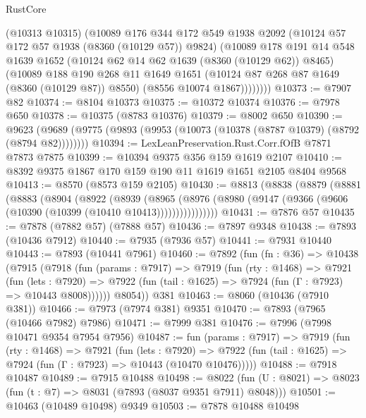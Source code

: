 \begin{lexlean}{RustCore}
\begin{coremodule}
            (@10313 @10315)
            (@10089
              @176
              @344
              @172
              @549
              @1938
              @2092
              (@10124 @57 @172 @57 @1938 (@8360 (@10129 @57)) @9824)
              (@10089
                @178
                @191
                @14
                @548
                @1639
                @1652
                (@10124 @62 @14 @62 @1639 (@8360 (@10129 @62)) @8465)
                (@10089
                  @188
                  @190
                  @268
                  @11
                  @1649
                  @1651
                  (@10124 @87 @268 @87 @1649 (@8360 (@10129 @87)) @8550)
                  (@8556 @10074 @1867))))))))
@10373 := @7907 @82
@10374 := @8104 @10373
@10375 := @10372 @10374
@10376 := @7978 @650
@10378 := @10375 (@8783 @10376)
@10379 := @8002 @650
@10390 := @9623 (@9689 (@9775 (@9893 (@9953 (@10073 (@10378 (@8787 @10379) (@8792 (@8794 @82))))))))
@10394 := LexLeanPreservation.Rust.Corr.fOfB @7871 @7873 @7875
@10399 := @10394 @9375 @356 @159 @1619 @2107
@10410 := @8392 @9375 @1867 @170 @159 @190 @11 @1619 @1651 @2105 @8404 @9568
@10413 := @8570 (@8573 @159 @2105)
@10430 := @8813
    (@8838
      (@8879
        (@8881
          (@8883
            (@8904
              (@8922
                (@8939
                  (@8965
                    (@8976
                      (@8980 (@9147 (@9366 (@9606 (@10390 (@10399 (@10410 @10413))))))))))))))))
@10431 := @7876 @57
@10435 := @7878 (@7882 @57) (@7888 @57)
@10436 := @7897 @9348
@10438 := @7893 (@10436 @7912)
@10440 := @7935 (@7936 @57)
@10441 := @7931 @10440
@10443 := @7893 (@10441 @7961)
@10460 := @7892
    (fun (fn : @36) =>
    @10438
      (@7915
        (@7918
          (fun (params : @7917) =>
          @7919
            (fun (rty : @1468) =>
            @7921
              (fun (lets : @7920) =>
              @7922 (fun (tail : @1625) => @7924 (fun (Γ : @7923) => @10443 @8008))))))
        @8054))
    @381
@10463 := @8060 (@10436 (@7910 @381))
@10466 := @7973 (@7974 @381) @9351
@10470 := @7893 (@7965 (@10466 @7982) @7986)
@10471 := @7999 @381
@10476 := @7996 (@7998 @10471 @9354 @7954 @7956)
@10487 := fun (params : @7917) =>
  @7919
    (fun (rty : @1468) =>
    @7921
      (fun (lets : @7920) =>
      @7922 (fun (tail : @1625) => @7924 (fun (Γ : @7923) => @10443 (@10470 @10476)))))
@10488 := @7918 @10487
@10489 := @7915 @10488
@10498 := @8022 (fun (U : @8021) => @8023 (fun (t : @7) => @8031 (@7893 (@8037 @9351 @7911) @8048)))
@10501 := @10463 (@10489 @10498) @9349
@10503 := @7878 @10488 @10498

\end{coremodule}
\end{lexlean}
